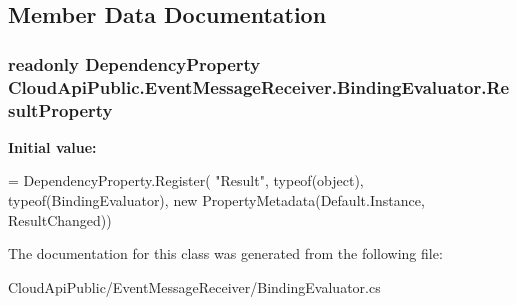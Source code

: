 \subsection{Member Data Documentation}
\hypertarget{class_cloud_api_public_1_1_event_message_receiver_1_1_binding_evaluator_ae1fff27340b14df912170510f645b4e0}{
\subsubsection[{Result\-Property}]{\setlength{\rightskip}{0pt plus 5cm}readonly Dependency\-Property Cloud\-Api\-Public.\-Event\-Message\-Receiver.\-Binding\-Evaluator.\-Result\-Property\hspace{0.3cm}{\ttfamily [static]}}}\label{class_cloud_api_public_1_1_event_message_receiver_1_1_binding_evaluator_ae1fff27340b14df912170510f645b4e0}
{\bfseries Initial value\-:}
\begin{DoxyCode}
= DependencyProperty.Register(
            \textcolor{stringliteral}{"Result"}, typeof(\textcolor{keywordtype}{object}), typeof(BindingEvaluator), \textcolor{keyword}{new} 
      PropertyMetadata(Default.Instance, ResultChanged))
\end{DoxyCode}


The documentation for this class was generated from the following file\-:\begin{DoxyCompactItemize}
\item 
Cloud\-Api\-Public/\-Event\-Message\-Receiver/Binding\-Evaluator.\-cs\end{DoxyCompactItemize}
